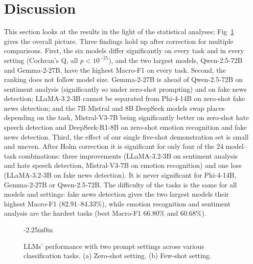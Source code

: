 \documentclass[10pt,letterpaper]{article}
\begin{document}
\section*{Discussion}
\label{sec:discussion}

This section looks at the results in the light of the statistical analyses; Fig~\ref{fig:classwise_performance} gives the overall picture. Three findings hold up after correction for multiple comparisons. First, the six models differ significantly on every task and in every setting (Cochran's Q, all $p < 10^{-25}$), and the two largest models, Qwen-2.5-72B and Gemma-2-27B, have the highest Macro-F1 on every task. Second, the ranking does not follow model size. Gemma-2-27B is ahead of Qwen-2.5-72B on sentiment analysis (significantly so under zero-shot prompting) and on fake news detection; LLaMA-3.2-3B cannot be separated from Phi-4-14B on zero-shot fake news detection; and the 7B Mistral and 8B DeepSeek models swap places depending on the task, Mistral-V3-7B being significantly better on zero-shot hate speech detection and DeepSeek-R1-8B on zero-shot emotion recognition and fake news detection. Third, the effect of our single five-shot demonstration set is small and uneven. After Holm correction it is significant for only four of the 24 model--task combinations: three improvements (LLaMA-3.2-3B on sentiment analysis and hate speech detection, Mistral-V3-7B on emotion recognition) and one loss (LLaMA-3.2-3B on fake news detection). It is never significant for Phi-4-14B, Gemma-2-27B or Qwen-2.5-72B. The difficulty of the tasks is the same for all models and settings: fake news detection gives the two largest models their highest Macro-F1 (82.91--84.33\%), while emotion recognition and sentiment analysis are the hardest tasks (best Macro-F1 66.80\% and 60.68\%).

\begin{figure}[t]
\begin{adjustwidth}{-2.25in}{0in}
    \centering
    \caption{LLMs' performance with two prompt settings across various classification tasks. (a) Zero-shot setting. (b) Few-shot setting.}
    \label{fig:classwise_performance}
\end{adjustwidth}
\end{figure}
\end{document}
